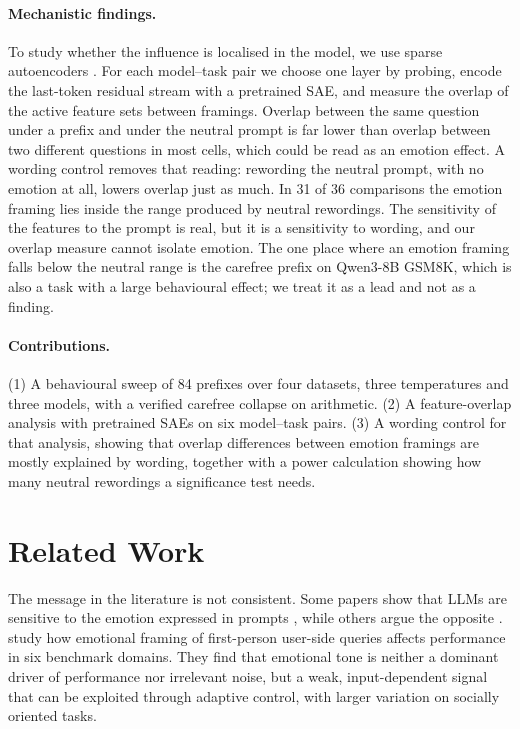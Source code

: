 \documentclass[11pt]{article}
\begin{document}
\paragraph{Mechanistic findings.} To study whether the influence is localised in the model, we use sparse autoencoders \citep{cunningham2024sae,bricken2023monosemanticity}. For each model--task pair we choose one layer by probing, encode the last-token residual stream with a pretrained SAE, and measure the overlap of the active feature sets between framings. Overlap between the same question under a prefix and under the neutral prompt is far lower than overlap between two different questions in most cells, which could be read as an emotion effect. A wording control removes that reading: rewording the neutral prompt, with no emotion at all, lowers overlap just as much. In 31 of 36 comparisons the emotion framing lies inside the range produced by neutral rewordings. The sensitivity of the features to the prompt is real, but it is a sensitivity to wording, and our overlap measure cannot isolate emotion. The one place where an emotion framing falls below the neutral range is the carefree prefix on Qwen3-8B GSM8K, which is also a task with a large behavioural effect; we treat it as a lead and not as a finding.

\paragraph{Contributions.} (1) A behavioural sweep of 84 prefixes over four datasets, three temperatures and three models, with a verified carefree collapse on arithmetic. (2) A feature-overlap analysis with pretrained SAEs on six model--task pairs. (3) A wording control for that analysis, showing that overlap differences between emotion framings are mostly explained by wording, together with a power calculation showing how many neutral rewordings a significance test needs.

\section{Related Work}

The message in the literature is not consistent. Some papers show that LLMs are sensitive to the emotion expressed in prompts \citep{li2023emotion,dobariya2025mind}, while others argue the opposite \citep{zhao2026emotions}. \citet{zhao2026emotions} study how emotional framing of first-person user-side queries affects performance in six benchmark domains. They find that emotional tone is neither a dominant driver of performance nor irrelevant noise, but a weak, input-dependent signal that can be exploited through adaptive control, with larger variation on socially oriented tasks.
\end{document}
